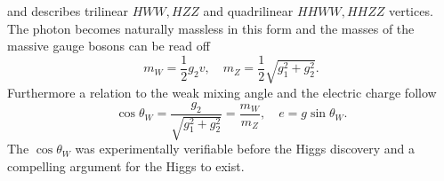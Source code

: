 and describes trilinear $HWW,HZZ$ and quadrilinear $HHWW,HHZZ$ vertices. The photon becomes naturally massless in this form and the masses of the massive gauge bosons can be read off
\begin{equation}
    m_W= \frac{1}{2}g_2v,\quad m_Z=\frac{1}{2}\sqrt{g_1^2+g_2^2}.
\end{equation}
Furthermore a relation to the weak mixing angle and the electric charge follow
\begin{equation}
    \cos\theta_W=\frac{g_2}{\sqrt{g_1^2+g_2^2}}=\frac{m_W}{m_Z}, \quad e=g\sin \theta_W.
\end{equation}
The $\cos\theta_W$ was experimentally verifiable before the Higgs discovery and a compelling argument for the Higgs to exist.



